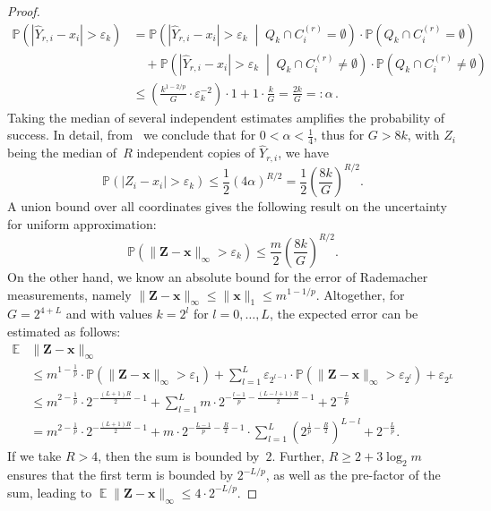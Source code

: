 \documentclass[12pt]{article}
\theoremstyle{plain}
\theoremstyle{definition}
\renewcommand{\P}{{\mathbb P}}
\newcommand{\expect}{\operatorname{\mathbb{E}}}
\newcommand{\eps}{\varepsilon}
\renewcommand{\vec}{\boldsymbol}
\begin{document}
\begin{proof}
\begin{align*}
       \P\left( |\hat{Y}_{r,i} - x_i| > \eps_k\right) 
      & =  \P\left(  |\hat{Y}_{r,i} - x_i| > \eps_k  \; \middle|\; Q_k \cap C_i^{(r)} = \emptyset  \right) \cdot
        \P\left(Q_k \cap C_i^{(r)} = \emptyset \right) 
      \\
      & \quad +  \P\left(  |\hat{Y}_{r,i} - x_i| > \eps_k  \; \middle|\; Q_k \cap C_i^{(r)} \neq \emptyset  \right) \cdot
        \P\left(Q_k \cap C_i^{(r)} \neq \emptyset \right)   
      \\
      & \leq \left(\frac{k^{1 - 2/p}}{G} \cdot \eps_k^{-2}\right) \cdot 1
        + 1 \cdot \frac{k}{G}
       = \frac{2k}{G} =: \alpha \,.
    \end{align*}
    Taking the median of several independent estimates amplifies the probability of success.
    In detail, from~\cite[eq~(2.6)]{NP09} 
    we conclude that for $0 < \alpha < \frac{1}{4}$, thus for $G > 8k$,
    with $Z_i$ being the median of~$R$ independent copies of $\hat{Y}_{r,i}$, we have
    \begin{equation*}
        \P\left( |Z_i - x_i| > \eps_k\right) 
            \leq \frac{1}{2} \left(4\alpha\right)^{R/2}
            = \frac{1}{2} \left(\frac{8k}{G}\right)^{R/2} .
    \end{equation*}
    A union bound over all coordinates
    gives the following result on the uncertainty for uniform approximation:
    \begin{equation*}
        \P\left( \|\vec{Z} - \vec{x}\|_\infty > \eps_k\right) 
            \leq \frac{m}{2} \left(\frac{8k}{G}\right)^{R/2}.
    \end{equation*}
    On the other hand, we know an absolute bound for the error of Rademacher measurements,
    namely $\|\vec{Z} - \vec{x}\|_\infty \leq \|\vec{x}\|_1 \leq m^{1-1/p}$.
    Altogether, for $G = 2^{4+L}$ and with values $k=2^l$ for $l=0,\ldots,L$,
    the expected error can be estimated as follows:
    \begin{align*}
        \expect  &\|\vec{Z} - \vec{x}\|_\infty
        \\
            &\leq m^{1-\frac{1}{p}} \cdot \P\left(\|\vec{Z} - \vec{x}\|_\infty > \eps_1\right)
                + \sum_{l=1}^{L} \eps_{2^{l-1}} \cdot \P\left(\|\vec{Z} - \vec{x}\|_\infty > \eps_{2^l}\right)
                + \eps_{2^L} \\
            &\leq m^{2-\frac{1}{p}} \cdot 2^{-\frac{(L+1)R}{2} - 1}
                + \sum_{l=1}^L m \cdot 2^{-\frac{l-1}{p} - \frac{(L-l+1)R}{2} - 1}
                + 2^{-\frac{L}{p}} \\
            &= m^{2-\frac{1}{p}} \cdot 2^{-\frac{(L+1)R}{2} - 1}
                + m \cdot 2^{- \frac{L-1}{p} - \frac{R}{2} - 1}
                    \cdot \sum_{l=1}^{L} \left(2^{\frac{1}{p} - \frac{R}{2}}\right)^{L-l}
                + 2^{-\frac{L}{p}} .
    \end{align*}
    If we take $R > 4$, then the sum is bounded by~$2$.
    Further, $R \geq 2 + 3\log_2m$ ensures that the first term is bounded by $2^{-L/p}$,
    as well as the pre-factor of the sum, leading to
    $\expect \|\vec{Z} - \vec{x}\|_\infty \leq 4 \cdot 2^{-L/p}$.
\end{proof}
\end{document}
